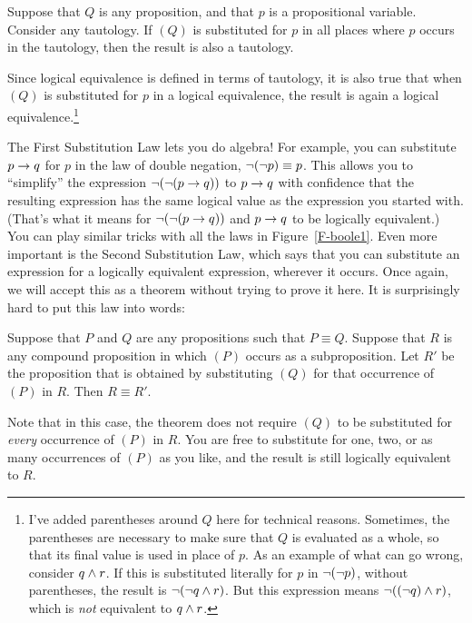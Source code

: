 \begin{theorem}\label{T-sub1}
Suppose that $Q$ is any proposition, and that $p$ is a propositional
variable.  Consider any tautology.  If $(Q)$ is substituted
for $p$ in all places where $p$ occurs in the tautology,
then the result is also a tautology.
\end{theorem}

Since logical equivalence is defined in terms of tautology,
it is also true that when $(Q)$ is substituted for $p$ in a logical equivalence,
the result is again a logical equivalence.\footnote{I've added parentheses around 
$Q$ here for technical reasons. Sometimes, the parentheses are necessary
to make sure that $Q$ is evaluated as a whole, so that its final value is used in place
of $p$.  As an example of what can go wrong, consider $q\wedge r$.  If this is
substituted literally for $p$ in $\lnot(\lnot p)$, without
parentheses, the result is $\lnot(\lnot q \wedge r)$.  But this expression
means $\lnot((\lnot q)\wedge r)$, which is \emph{not} equivalent to
$q\wedge r$.}

The First Substitution Law lets you do algebra!  For example, you
can substitute $p\rightarrow q$ for $p$ in the law of double negation, $\lnot(\lnot p)\equiv p$.
This allows you
to ``simplify'' the expression $\lnot(\lnot(p\rightarrow q))$ to $p\rightarrow q$
with confidence that the resulting expression has the same logical
value as the expression you started with.  (That's what it means for
$\lnot(\lnot(p\rightarrow q))$ and $p\rightarrow q$ to be logically equivalent.)
You can play similar tricks with all the laws in Figure~\ref{F-boole1}.
Even more important is the Second Substitution Law, which says
that you can substitute an expression for a logically equivalent
expression, wherever it occurs.  Once again, we will accept this
as a theorem without trying to prove it here.  It is surprisingly
hard to put this law into words:

\begin{theorem}\label{T-sub2}
Suppose that $P$ and $Q$ are any propositions such that $P\equiv Q$.
Suppose that $R$ is any compound proposition in which $(P)$
occurs as a subproposition.  Let $R'$ be the proposition that is
obtained by substituting $(Q)$ for that occurrence of $(P)$ in $R$.
Then $R\equiv R'$.
\end{theorem}

Note that in this case, the theorem does not require $(Q)$ to be
substituted for \emph{every} occurrence of $(P)$ in $R$.  You are free
to substitute for one, two, or as many occurrences of $(P)$ as you like,
and the result is still logically equivalent to $R$.

